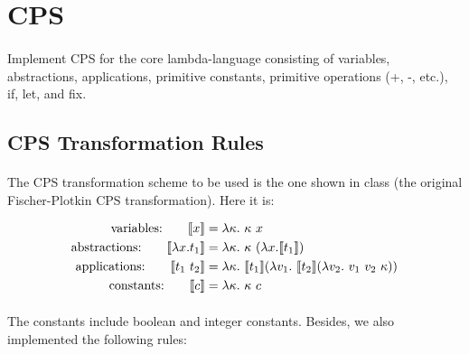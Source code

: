 \documentclass[10pt]{article}
\begin{document}
\section{CPS}

\paragraph{}

Implement CPS for the core lambda-language consisting of variables, abstractions, applications, primitive constants, primitive operations (+, -, etc.), if, let, and fix.

\subsection{CPS Transformation Rules}

\paragraph{}
The CPS transformation scheme to be used is the one shown in class (the original Fischer-Plotkin CPS transformation). Here it is:

\begin{align*}
        \text{variables:\quad \quad } \llbracket x \rrbracket & = \lambda \kappa.\text{ }\kappa\text{ }x\\
        \text{abstractions:\quad \quad } \llbracket \lambda x.t_1 \rrbracket & = \lambda \kappa.\text{ }\kappa\text{ }(\lambda x.\llbracket t_1 \rrbracket)\\
        \text{applications:\quad \quad } \llbracket t_1\text{ }t_2 \rrbracket & = \lambda \kappa.\text{ }\llbracket t_1 \rrbracket (\lambda v_1.\text{ }\llbracket t_2 \rrbracket (\lambda v_2.\text{ }v_1\text{ }v_2\text{ }\kappa))\\
        \text{constants:\quad \quad} \llbracket c \rrbracket &= \lambda \kappa.\text{ }\kappa\text{ }c
\end{align*}

\paragraph{}
The constants include boolean and integer constants. Besides, we also implemented the following rules:
\end{document}
